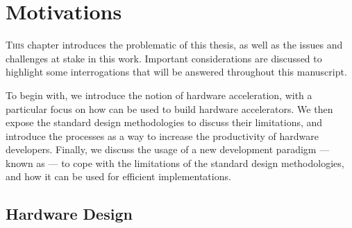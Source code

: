 \chapter{Motivations}

\renewcommand{\labelitemi}{$-$}



\lettrine[lines=2]{T}{his} chapter introduces the problematic of this thesis, as well as the issues and challenges at stake in this work.
Important considerations are discussed to highlight some interrogations that will be answered throughout this manuscript.

To begin with, we introduce the notion of hardware acceleration, with a particular focus on how  can be used to build hardware accelerators.
We then expose the standard design methodologies to discuss their limitations, and introduce the  processes as a way to increase the productivity of hardware developers.
Finally, we discuss the usage of a new development paradigm --- known as  --- to cope with the limitations of the standard design methodologies, and how it can be used for efficient  implementations.

\vspace*{\fill}
\minitoc 
\mtcskip 

\newpage

\section{Hardware Design}
\label{ch.problem:sec.hardware}

